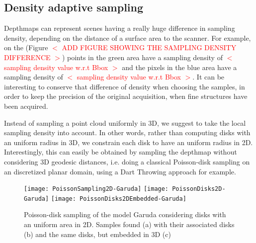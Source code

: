 \documentclass[11pt,fleqn]{book} %
\newcommand{\arnaud}[1]{\textcolor{red}{$<$ #1 $>$}}
\begin{document}
\subsection{Density adaptive sampling}
Depthmaps can represent scenes having a really huge difference in sampling density, depending on the distance of a surface area to the scanner. 
For example, on the (Figure \arnaud{ADD FIGURE SHOWING THE SAMPLING DENSITY DIFFERENCE}) points in the green area have a sampling density of \arnaud{sampling density value w.r.t Bbox} and the pixels in the blue area have a sampling density of \arnaud{sampling density value w.r.t Bbox}. It can be interesting to conserve that difference of density when choosing the samples, in order to keep the precision of the original acquisition, when fine structures have been acquired.

Instead of sampling a point cloud uniformly in 3D, we suggest to take the local sampling density into account. In other words, rather than computing disks with an uniform radius in 3D, we constrain each disk to have an uniform radius in 2D.
Interestingly, this can easily be obtained by sampling the depthmap without considering 3D geodesic distances, i.e. doing a classical Poisson-disk sampling on an discretized planar domain, using a Dart Throwing approach for example.

\begin{figure}[ht]
\centering
\texttt{[image: PoissonSampling2D-Garuda]}
\texttt{[image: PoissonDisks2D-Garuda]}
\texttt{[image: PoissonDisks2DEmbedded-Garuda]}
\caption{Poisson-disk sampling of the model Garuda considering disks with an uniform area in 2D. Samples found (a) with their associated disks (b) and the same disks, but embedded in 3D (c)}
\label{fig:poisson_sampling_2d}
\end{figure}

\end{document}
